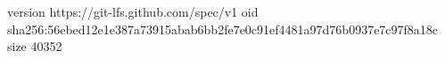 version https://git-lfs.github.com/spec/v1
oid sha256:56ebed12e1e387a73915abab6bb2fe7e0c91ef4481a97d76b0937e7c97f8a18c
size 40352
